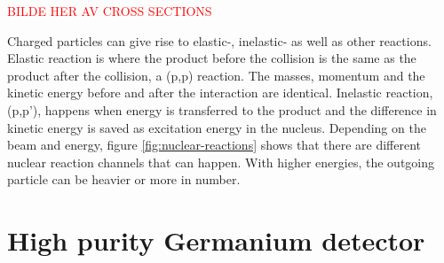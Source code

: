 \documentclass[twoside,english]{uiofysmaster/uiofysmaster}
\begin{document}
\textcolor{red}{BILDE HER AV CROSS SECTIONS}


Charged particles can give rise to elastic-, inelastic- as well as other reactions. Elastic reaction is where the product before the collision is the same as the product after the collision, a (p,p) reaction. The masses, momentum and the kinetic energy before and after the interaction are identical\cite{Nuclear_medicine}.
Inelastic reaction, (p,p'), happens when energy is transferred to the product and the difference in kinetic energy is saved as excitation energy in the nucleus.
\noindent
Depending on the beam and energy, figure \ref{fig:nuclear-reactions} shows that there are different nuclear reaction channels that can happen. With higher energies, the outgoing particle can be heavier or more in number. 


\section{High purity Germanium detector}
\label{sec:ge-detector}
\end{document}
